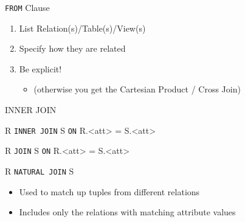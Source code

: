 \documentclass[aspectratio=169]{beamer}
\begin{document}
\begin{frame}[fragile]{\texttt{FROM} Clause}

\begin{enumerate}
\item List Relation(s)/Table(s)/View(s)
\item Specify how they are related
\item Be explicit!
\begin{itemize}
\item (otherwise you get the Cartesian Product / Cross Join)
\end{itemize}
\end{enumerate}
\end{frame}
%
%
%
\begin{frame}{INNER JOIN}

R \texttt{INNER JOIN} S \texttt{ON} R.<att> = S.<att>

R \texttt{JOIN} S \texttt{ON} R.<att> = S.<att>

R  \texttt{NATURAL JOIN}  S

\begin{itemize}
\item Used to match up tuples from different relations
\item Includes only the relations with matching attribute values 
\end{itemize}

\end{frame}
\end{document}
